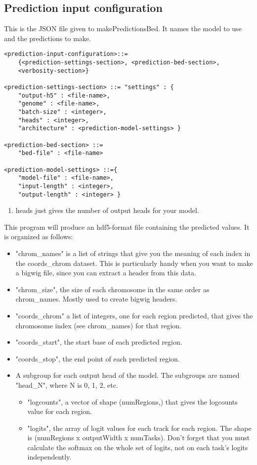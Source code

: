 \documentclass{article}
\begin{document}
\subsection{Prediction input configuration}
This is the JSON file given to makePredictionsBed. It names the model to use and the predictions to make. 

\begin{lstlisting}
<prediction-input-configuration>::=
    {<prediction-settings-section>, <prediction-bed-section>,
    <verbosity-section>}

<prediction-settings-section> ::= "settings" : {
    "output-h5" : <file-name>,
    "genome" : <file-name>,
    "batch-size" : <integer>,
    "heads" : <integer>,
    "architecture" : <prediction-model-settings> }

<prediction-bed-section> ::=
    "bed-file" : <file-name>

<prediction-model-settings> ::={
    "model-file" : <file-name>,
    "input-length" : <integer>,
    "output-length" : <integer> }
\end{lstlisting}
\begin{enumerate}

    \item heads just gives the number of output heads for your model. 

\end{enumerate}

This program will produce an hdf5-format file containing the predicted values. It is organized as follows:

\begin{itemize}
    \item "chrom\_names" is a list of strings that give you the meaning of each index in the coords\_chrom dataset. This is particularly handy when you want to make a bigwig file, since you can extract a header from this data. 
    \item "chrom\_size", the size of each chromosome in the same order as chrom\_names. Mostly used to create bigwig headers. 
    \item "coords\_chrom" a list of integers, one for each region predicted, that gives the chromosome index (see chrom\_names) for that region. 
    \item "coords\_start", the start base of each predicted region. 
    \item "coords\_stop", the end point of each predicted region.
    \item A subgroup for each output head of the model. The subgroups are named "head\_N", where N is 0, 1, 2, etc. 
        \begin{itemize}
            \item "logcounts", a vector of shape (numRegions,) that gives the logcounts value for each region. 
            \item "logits", the array of logit values for each track for each region. The shape is (numRegions x outputWidth x numTasks). Don't forget that you must calculate the softmax on the whole set of logits, not on each task's logits independently.
        \end{itemize} 

\end{itemize}
\end{document}

